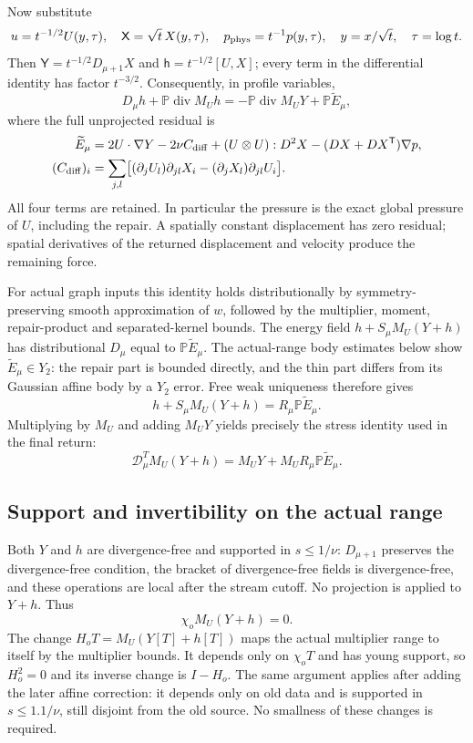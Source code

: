 Now substitute
\[
 u=t^{-1/2}U(y,\tau),\quad
 \mathsf X=\sqrt t\,X(y,\tau),\quad
 p_{\rm phys}=t^{-1}p(y,\tau),\quad
 y=x/\sqrt t,\quad\tau=\log t.
\]
Then $\mathsf Y=t^{-1/2}D_{\mu+1}X$ and
$\mathsf h=t^{-1/2}[U,X]$; every term in the differential identity
has factor $t^{-3/2}$. Consequently, in profile variables,
\begin{equation}\label{ward:physical-identity}
 D_\mu h+\mathbb P\operatorname{div}M_Uh
 =-\mathbb P\operatorname{div}M_UY+\mathbb P\widetilde E_\mu,
\end{equation}
where the full unprojected residual is
\begin{align}
 \widetilde E_\mu
   &=2U\cdot\nabla Y-2\nu C_{\rm diff}
       +(U\otimes U):D^2X-(DX+DX^{\mathsf T})\nabla p,
       \label{ward:residual}\\
 (C_{\rm diff})_i
   &=\sum_{j,l}\bigl[(\partial_jU_l)\partial_{jl}X_i
              -(\partial_jX_l)\partial_{jl}U_i\bigr].\notag
\end{align}
All four terms are retained. In particular the pressure is the exact
global pressure of $U$, including the repair. A spatially constant
displacement has zero residual; spatial derivatives of the returned
displacement and velocity produce the remaining force.

For actual graph inputs this identity holds distributionally by
symmetry-preserving smooth approximation of $w$, followed by the
multiplier, moment, repair-product and separated-kernel bounds.
The energy field $h+S_\mu M_U(Y+h)$ has distributional
$D_\mu$ equal to $\mathbb P\widetilde E_\mu$.
The actual-range body estimates below show
$\widetilde E_\mu\in Y_2$: the repair part is bounded directly,
and the thin part differs from its Gaussian affine body by a
$Y_2$ error. Free weak uniqueness therefore gives
\[
 h+S_\mu M_U(Y+h)=R_\mu\mathbb P\widetilde E_\mu.
\]
Multiplying by $M_U$ and adding $M_UY$ yields precisely the
stress identity used in the final return:
\begin{equation}\label{ward:stress-normal}
 \mathcal D_\mu^T M_U(Y+h)
       =M_UY+M_UR_\mu\mathbb P\widetilde E_\mu.
\end{equation}

\subsection{Support and invertibility on the actual range}

Both $Y$ and $h$ are divergence-free and supported in $s\le1/\nu$:
$D_{\mu+1}$ preserves the divergence-free condition, the bracket of divergence-free
fields is divergence-free, and these operations are local after the
stream cutoff. No projection is applied to $Y+h$. Thus
\begin{equation}\label{ward:support-zero}
 \chi_oM_U(Y+h)=0.
\end{equation}
The change $H_oT=M_U(Y[T]+h[T])$ maps the actual multiplier
range to itself by the multiplier bounds. It depends only on
$\chi_oT$ and has young support, so $H_o^2=0$ and its inverse
change is $I-H_o$. The same argument applies after adding the
later affine correction: it depends only on old data and is
supported in $s\le1.1/\nu$, still disjoint from the old source.
No smallness of these changes is required.

